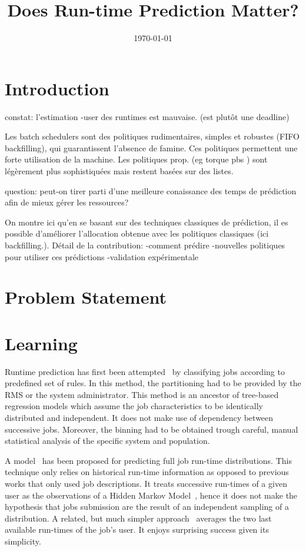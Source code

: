 \title{Does Run-time Prediction Matter?}
\author{}
\date{\today}


\maketitle

\section{Introduction}
\label{sec:introduction}
constat: l'estimation -user des runtimes est mauvaise. (est plutôt une deadline)

Les batch schedulers sont des politiques rudimentaires, simples et robustes (FIFO backfilling), qui guarantissent l'absence de famine. Ces politiques permettent une forte utilisation de la machine.
Les politiques prop. (eg torque pbs ) sont légèrement plus sophistiquées mais restent basées sur des listes.\

question: peut-on tirer parti d'une meilleure conaissance des temps de prédiction afin de mieux gérer les ressources?

On montre ici qu'en se basant sur des techniques classiques de prédiction, il es possible d'améliorer  l'allocation obtenue avec les politiques classiques (ici backfilling.).
Détail de la contribution:
-comment prédire
-nouvelles politiques pour utiliser ces prédictions
-validation expérimentale

\section{Problem Statement}
\label{sec:problem_statement}

\section{Learning}
\label{sec:learning}
Runtime prediction has first been attempted~\cite{gibbons} by classifying jobs according to predefined set of rules. In this method, the partitioning had to be provided by the RMS or the system administrator. This method is an ancestor of tree-based regression models which assume the job characteristics to be identically distributed and independent. It does not make use of dependency between successive jobs. Moreover, the binning had to be obtained trough careful, manual statistical analysis of the specific system and population.

A model~\cite{hmm} has been proposed for predicting full job run-time distributions. This technique only relies on historical run-time information as opposed to previous works that only used job descriptions. It treats successive run-times of a given user as the observations of a Hidden Markov Model~\cite{rabiner}, hence it does not make the hypothesis that jobs submission are the result of an independent sampling of a distribution.
A related, but much simpler approach~\cite{tsafir} averages the two last available run-times of the job's user. It enjoys surprising success given its simplicity.

